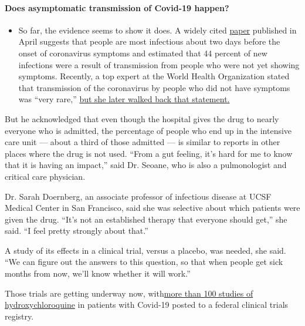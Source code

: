 \begin{itemize}
{  \paragraph{Does asymptomatic transmission of Covid-19
  happen?}\label{does-asymptomatic-transmission-of-covid-19-happen}}

  \begin{itemize}
  \tightlist
  \item
    So far, the evidence seems to show it does. A widely cited
    \href{https://www.nature.com/articles/s41591-020-0869-5}{paper}
    published in April suggests that people are most infectious about
    two days before the onset of coronavirus symptoms and estimated that
    44 percent of new infections were a result of transmission from
    people who were not yet showing symptoms. Recently, a top expert at
    the World Health Organization stated that transmission of the
    coronavirus by people who did not have symptoms was ``very rare,''
    \href{https://www.nytimes3xbfgragh.onion/2020/06/09/world/coronavirus-updates.html?action=click\&pgtype=Article\&state=default\&region=MAIN_CONTENT_3\&context=storylines_faq\#link-1f302e21}{but
    she later walked back that statement.}
  \end{itemize}
\end{itemize}

But he acknowledged that even though the hospital gives the drug to
nearly everyone who is admitted, the percentage of people who end up in
the intensive care unit --- about a third of those admitted --- is
similar to reports in other places where the drug is not used. ``From a
gut feeling, it's hard for me to know that it is having an impact,''
said Dr. Seoane, who is also a pulmonologist and critical care
physician.

Dr. Sarah Doernberg, an associate professor of infectious disease at
UCSF Medical Center in San Francisco, said she was selective about which
patients were given the drug. ``It's not an established therapy that
everyone should get,'' she said. ``I feel pretty strongly about that.''

A study of its effects in a clinical trial, versus a placebo, was
needed, she said. ``We can figure out the answers to this question, so
that when people get sick months from now, we'll know whether it will
work.''

Those trials are getting underway now,
with\href{https://clinicaltrials.gov/ct2/results?cond=COVID\&term=hydroxychloroquine\&cntry=\&state=\&city=\&dist=}{more
than 100 studies of hydroxychloroquine} in patients with Covid-19 posted
to a federal clinical trials registry.

